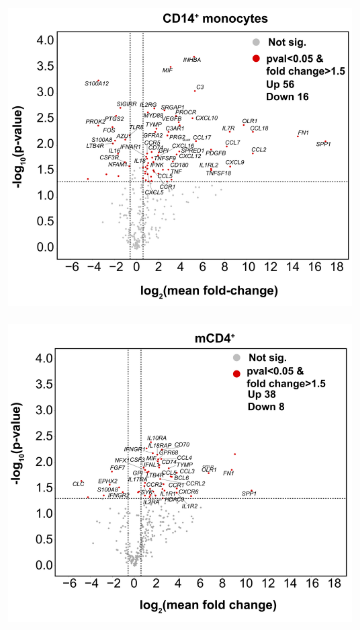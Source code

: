 \begin{figure}[htbp]
\centering
\begin{subfigure}{0.48\textwidth}
\centering
\includegraphics[width=\textwidth]{./Results3/pdfs/PSA_CD14_vulcano_plot_PCR_array_mean_FC}
\caption{\textbf{}}
\end{subfigure}%
\begin{subfigure}{0.48\textwidth}
\centering
\includegraphics[width=\textwidth]{./Results3/pdfs/PSA_CD4_vulcano_plot_PCR_array_mean_FC}

\end{subfigure}
\end{figure}
